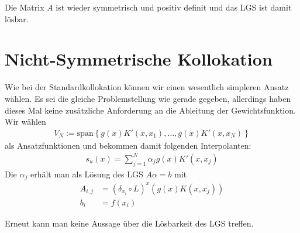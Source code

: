 Die Matrix $A$ ist wieder symmetrisch und positiv definit und das \ac{LGS} ist damit lösbar.
\section{Nicht-Symmetrische Kollokation}
Wie bei der Standardkollokation können wir einen wesentlich simpleren Ansatz wählen. Es sei die gleiche Problemstellung wie gerade gegeben, allerdings haben dieses Mal keine zusätzliche Anforderung an die Ableitung der Gewichtsfunktion. Wir wählen 
\begin{align*}
V_N:= \text{span} \left\{g(x)K'(x,x_1), \dots, g(x)K'(x,x_N)\right\}
\end{align*}
als Ansatzfunktionen und bekommen damit folgenden Interpolanten:
\begin{align*}
s_u (x) = \sum_{j=1}^N \alpha_j g(x)K'(x,x_j)
\end{align*}
Die $\alpha_j$ erhält man als Lösung des \ac{LGS} $A\alpha = b$ mit 
\begin{align*}
A_{i,j} &= (\delta_{x_i} \circ L)^x (g(x) K(x,x_j))\\
b_i &= f(x_i)
\end{align*}

Erneut kann man keine Aussage über die Lösbarkeit des \ac{LGS} treffen.